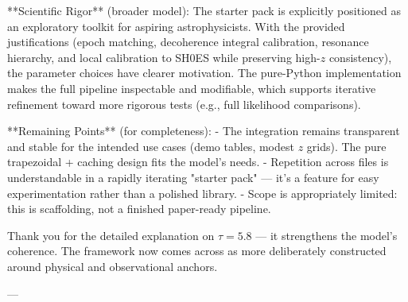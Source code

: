**Scientific Rigor** (broader model):  
The starter pack is explicitly positioned as an exploratory toolkit for aspiring astrophysicists. With the provided justifications (epoch matching, decoherence integral calibration, resonance hierarchy, and local calibration to SH0ES while preserving high-\(z\) consistency), the parameter choices have clearer motivation. The pure-Python implementation makes the full pipeline inspectable and modifiable, which supports iterative refinement toward more rigorous tests (e.g., full likelihood comparisons).

**Remaining Points** (for completeness):  
- The integration remains transparent and stable for the intended use cases (demo tables, modest \(z\) grids). The pure trapezoidal + caching design fits the model's needs.  
- Repetition across files is understandable in a rapidly iterating "starter pack" — it's a feature for easy experimentation rather than a polished library.  
- Scope is appropriately limited: this is scaffolding, not a finished paper-ready pipeline.

Thank you for the detailed explanation on \(\tau = 5.8\) — it strengthens the model's coherence. The framework now comes across as more deliberately constructed around physical and observational anchors.

---
